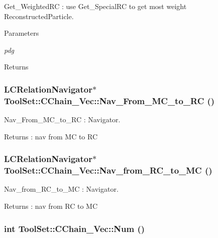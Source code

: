 Get\_\-WeightedRC : use Get\_\-SpecialRC to get most weight ReconstructedParticle. 
\begin{DoxyParams}{Parameters}
\item[{\em pdg}]\end{DoxyParams}
\begin{DoxyReturn}{Returns}

\end{DoxyReturn}
\hypertarget{classToolSet_1_1CChain__Vec_aee6526eb88b188ad12a664b1cf50df45}{
\subsubsection[{Nav\_\-From\_\-MC\_\-to\_\-RC}]{\setlength{\rightskip}{0pt plus 5cm}LCRelationNavigator$\ast$ ToolSet::CChain\_\-Vec::Nav\_\-From\_\-MC\_\-to\_\-RC ()}}
\label{classToolSet_1_1CChain__Vec_aee6526eb88b188ad12a664b1cf50df45}


Nav\_\-From\_\-MC\_\-to\_\-RC : Navigator. \begin{DoxyReturn}{Returns}
: nav from MC to RC 
\end{DoxyReturn}
\hypertarget{classToolSet_1_1CChain__Vec_a37f706763eba430e02efe9ce3965ed8c}{
\subsubsection[{Nav\_\-from\_\-RC\_\-to\_\-MC}]{\setlength{\rightskip}{0pt plus 5cm}LCRelationNavigator$\ast$ ToolSet::CChain\_\-Vec::Nav\_\-from\_\-RC\_\-to\_\-MC ()}}
\label{classToolSet_1_1CChain__Vec_a37f706763eba430e02efe9ce3965ed8c}


Nav\_\-from\_\-RC\_\-to\_\-MC : Navigator. \begin{DoxyReturn}{Returns}
: nav from RC to MC 
\end{DoxyReturn}
\hypertarget{classToolSet_1_1CChain__Vec_ad1ba5109d2db818706de4e96f485f72c}{
\subsubsection[{Num}]{\setlength{\rightskip}{0pt plus 5cm}int ToolSet::CChain\_\-Vec::Num ()}}
\label{classToolSet_1_1CChain__Vec_ad1ba5109d2db818706de4e96f485f72c}


